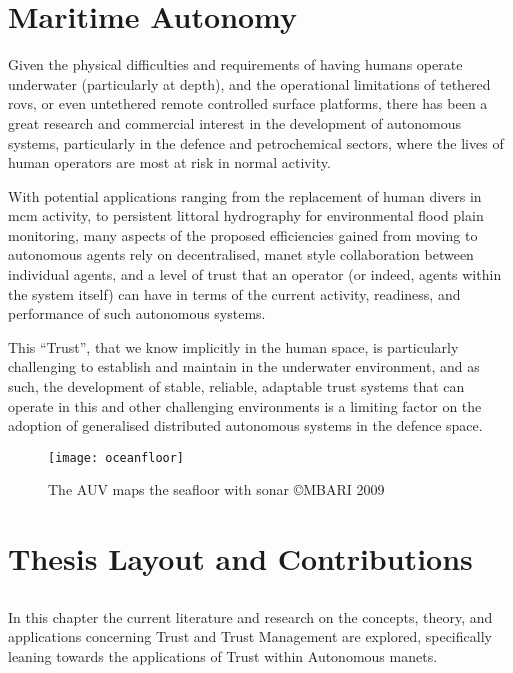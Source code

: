 \section{Maritime Autonomy}

Given the physical difficulties and requirements of having humans operate underwater (particularly at depth), and the operational limitations of tethered \glspl{rov}, or even untethered remote controlled surface platforms, there has been a great research and commercial interest in the development of autonomous systems, particularly in the defence and petrochemical sectors, where the lives of human operators are most at risk in normal activity\cite{Pechoucek:2008:DIA:1355335}.

With potential applications ranging from the replacement of human divers in \gls{mcm} activity, to persistent littoral hydrography for environmental flood plain monitoring, many aspects of the proposed efficiencies gained from moving to autonomous agents rely on decentralised, \gls{manet} style collaboration between individual agents, and a level of trust that an operator (or indeed, agents within the system itself) can have in terms of the current activity, readiness, and performance of such autonomous systems\cite{Wynn2014}.

This ``Trust'', that we know implicitly in the human space, is particularly challenging to establish and maintain in the underwater environment, and as such, the development of stable, reliable, adaptable trust systems that can operate in this and other challenging environments is a limiting factor on the adoption of generalised distributed autonomous systems in the defence space\cite{Caseley2009}.

\begin{figure}[h]
	\centering
	\texttt{[image: oceanfloor]}
	\caption{The AUV maps the seafloor with sonar \copyright MBARI 2009}
\end{figure}


\section{Thesis Layout and Contributions}

\subsection{}
In this chapter the current literature and research on the concepts, theory, and applications concerning Trust and Trust Management are explored, specifically leaning towards the applications of Trust within Autonomous \glspl{manet}.

